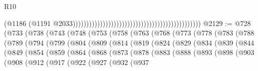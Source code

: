 \begin{lexlean}{R10}
\begin{coremodule}
                                                                                              (@1186
                                                                                                (@1191
                                                                                                  @2033)))))))))))))))))))))))))))))))))))))))))))))))
@2129 := @728
    (@733
      (@738
        (@743
          (@748
            (@753
              (@758
                (@763
                  (@768
                    (@773
                      (@778
                        (@783
                          (@788
                            (@789
                              (@794
                                (@799
                                  (@804
                                    (@809
                                      (@814
                                        (@819
                                          (@824
                                            (@829
                                              (@834
                                                (@839
                                                  (@844
                                                    (@849
                                                      (@854
                                                        (@859
                                                          (@864
                                                            (@868
                                                              (@873
                                                                (@878
                                                                  (@883
                                                                    (@888
                                                                      (@893
                                                                        (@898
                                                                          (@903
                                                                            (@908
                                                                              (@912
                                                                                (@917
                                                                                  (@922
                                                                                    (@927
                                                                                      (@932
                                                                                        (@937

\end{coremodule}
\end{lexlean}
